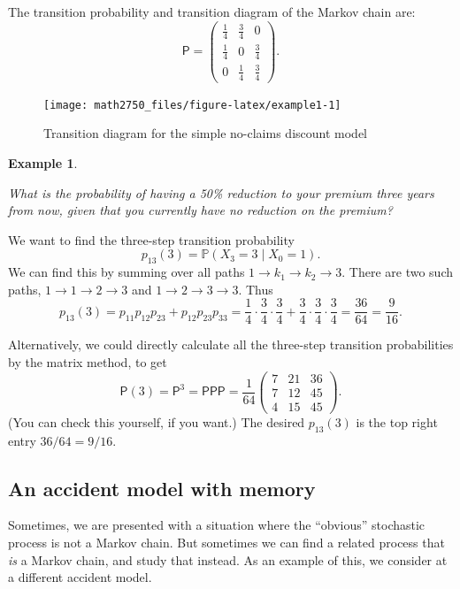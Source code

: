 \documentclass[
  a4paper,
]{article}
\theoremstyle{definition}
\theoremstyle{definition}
\newtheorem{example}{Example}[section]
\theoremstyle{definition}
\theoremstyle{remark}
\begin{document}
The transition probability and transition diagram of the Markov chain are:
\[ \mathsf P = \begin{pmatrix} \frac14 & \frac34 & 0 \\ \frac14 & 0 & \frac34 \\ 0 & \frac14 & \frac34 \end{pmatrix} . \]

\begin{figure}

{\centering \texttt{[image: math2750\_files/figure-latex/example1-1]} 

}

\caption{Transition diagram for the simple no-claims discount model}\label{fig:example1}
\end{figure}

\begin{example}
\protect\hypertarget{exm:act1}{}\label{exm:act1}

\emph{What is the probability of having a 50\% reduction to your premium three years from now, given that you currently have no reduction on the premium?}

We want to find the three-step transition probability
\[
p_{13}(3) = \mathbb P(X_{3} = 3 \mid X_0=1) .
\]
We can find this by summing over all paths \(1 \to k_1 \to k_2 \to 3\). There are two such paths, \(1 \to 1 \to 2 \to 3\) and \(1 \to 2 \to 3 \to 3\). Thus
\[ p_{13}(3) = p_{11}p_{12}p_{23} + p_{12}p_{23}p_{33} = \frac14 \cdot\frac34 \cdot\frac34 + \frac34 \cdot\frac34 \cdot\frac34 = \frac{36}{64} = \frac{9}{16} . \]

Alternatively, we could directly calculate all the three-step transition probabilities by the matrix method, to get
\[ \mathsf P(3) = \mathsf P^3 = \mathsf{PPP} = \frac{1}{64} \begin{pmatrix} 7 & 21 & 36 \\ 7 & 12 & 45 \\ 4 & 15 & 45 \end{pmatrix} .\]
(You can check this yourself, if you want.) The desired \(p_{13}(3)\) is the top right entry \(36/64 = 9/16\).

\end{example}

\hypertarget{S06-example2}{%
\subsection{An accident model with memory}\label{S06-example2}}

Sometimes, we are presented with a situation where the ``obvious'' stochastic process is not a Markov chain. But sometimes we can find a related process that \emph{is} a Markov chain, and study that instead. As an example of this, we consider at a different accident model.
\end{document}
